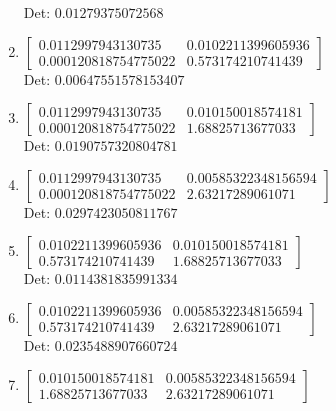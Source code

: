 \documentclass[12pt]{article}
\begin{document}
\begin{enumerate}
Det: $0.01279375072568$\\

\item $\displaystyle \left[\begin{matrix}0.0112997943130735 & 0.0102211399605936\\0.000120818754775022 & 0.573174210741439\end{matrix}\right]$\\

Det: $0.00647551578153407$\\

\item $\displaystyle \left[\begin{matrix}0.0112997943130735 & 0.010150018574181\\0.000120818754775022 & 1.68825713677033\end{matrix}\right]$\\

Det: $0.0190757320804781$\\

\item $\displaystyle \left[\begin{matrix}0.0112997943130735 & 0.00585322348156594\\0.000120818754775022 & 2.63217289061071\end{matrix}\right]$\\

Det: $0.0297423050811767$\\

\item $\displaystyle \left[\begin{matrix}0.0102211399605936 & 0.010150018574181\\0.573174210741439 & 1.68825713677033\end{matrix}\right]$\\

Det: $0.0114381835991334$\\

\item $\displaystyle \left[\begin{matrix}0.0102211399605936 & 0.00585322348156594\\0.573174210741439 & 2.63217289061071\end{matrix}\right]$\\

Det: $0.0235488907660724$\\

\item $\displaystyle \left[\begin{matrix}0.010150018574181 & 0.00585322348156594\\1.68825713677033 & 2.63217289061071\end{matrix}\right]$\\


\end{enumerate}
\end{document}
